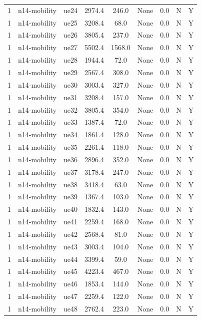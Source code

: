 \begin{table}[ht]
\begin{tabular}{|c|c|c|c|c|c|c|c|c|}
1 & n14-mobility & ue24 & 2974.4 & 246.0 & None & 0.0 & N & Y \\
1 & n14-mobility & ue25 & 3208.4 & 68.0 & None & 0.0 & N & Y \\
1 & n14-mobility & ue26 & 3805.4 & 237.0 & None & 0.0 & N & Y \\
1 & n14-mobility & ue27 & 5502.4 & 1568.0 & None & 0.0 & N & Y \\
1 & n14-mobility & ue28 & 1944.4 & 72.0 & None & 0.0 & N & Y \\
1 & n14-mobility & ue29 & 2567.4 & 308.0 & None & 0.0 & N & Y \\
1 & n14-mobility & ue30 & 3003.4 & 327.0 & None & 0.0 & N & Y \\
1 & n14-mobility & ue31 & 3208.4 & 157.0 & None & 0.0 & N & Y \\
1 & n14-mobility & ue32 & 3805.4 & 354.0 & None & 0.0 & N & Y \\
1 & n14-mobility & ue33 & 1387.4 & 72.0 & None & 0.0 & N & Y \\
1 & n14-mobility & ue34 & 1861.4 & 128.0 & None & 0.0 & N & Y \\
1 & n14-mobility & ue35 & 2261.4 & 118.0 & None & 0.0 & N & Y \\
1 & n14-mobility & ue36 & 2896.4 & 352.0 & None & 0.0 & N & Y \\
1 & n14-mobility & ue37 & 3178.4 & 247.0 & None & 0.0 & N & Y \\
1 & n14-mobility & ue38 & 3418.4 & 63.0 & None & 0.0 & N & Y \\
1 & n14-mobility & ue39 & 1367.4 & 103.0 & None & 0.0 & N & Y \\
1 & n14-mobility & ue40 & 1832.4 & 143.0 & None & 0.0 & N & Y \\
1 & n14-mobility & ue41 & 2259.4 & 168.0 & None & 0.0 & N & Y \\
1 & n14-mobility & ue42 & 2568.4 & 81.0 & None & 0.0 & N & Y \\
1 & n14-mobility & ue43 & 3003.4 & 104.0 & None & 0.0 & N & Y \\
1 & n14-mobility & ue44 & 3399.4 & 59.0 & None & 0.0 & N & Y \\
1 & n14-mobility & ue45 & 4223.4 & 467.0 & None & 0.0 & N & Y \\
1 & n14-mobility & ue46 & 1853.4 & 144.0 & None & 0.0 & N & Y \\
1 & n14-mobility & ue47 & 2259.4 & 122.0 & None & 0.0 & N & Y \\
1 & n14-mobility & ue48 & 2762.4 & 223.0 & None & 0.0 & N & Y \\

\end{tabular}
\end{table}
